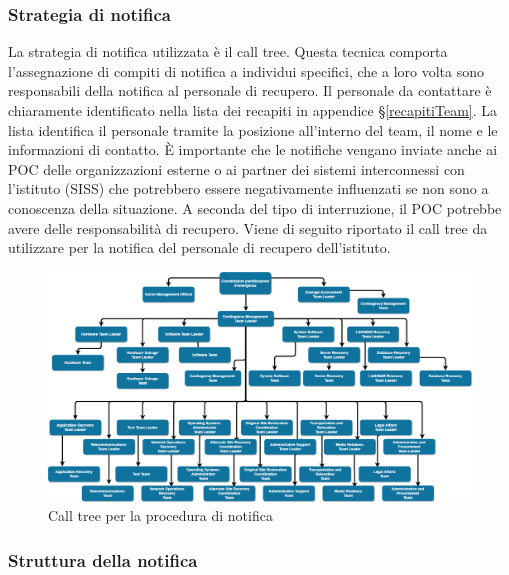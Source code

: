 \documentclass[12pt, a4paper, titlepage]{report}
\begin{document}
	\subsubsection{Strategia di notifica}
	
	La strategia di notifica utilizzata è il call tree. Questa tecnica comporta l'assegnazione di compiti di notifica a individui specifici, che a loro volta sono responsabili della notifica al personale di recupero.
	Il personale da contattare è chiaramente identificato nella lista dei recapiti in appendice §\ref{recapitiTeam}. La lista identifica il personale tramite la posizione all'interno del team, il nome e le informazioni di contatto. È importante che le notifiche vengano inviate anche ai POC delle organizzazioni esterne o ai partner dei sistemi interconnessi con l'istituto (SISS) che potrebbero essere negativamente influenzati se non sono a conoscenza della situazione. A seconda del tipo di interruzione, il POC potrebbe avere delle responsabilità di recupero. Viene di seguito riportato il call tree da utilizzare per la notifica del personale di recupero dell'istituto.
	
	\begin{figure}[h]
		\centering
		\includegraphics[scale=0.3]{./img/callTree.png}
		\caption{Call tree per la procedura di notifica}
	\end{figure}
	\newpage
	\subsubsection{Struttura della notifica}
	
\end{document}

